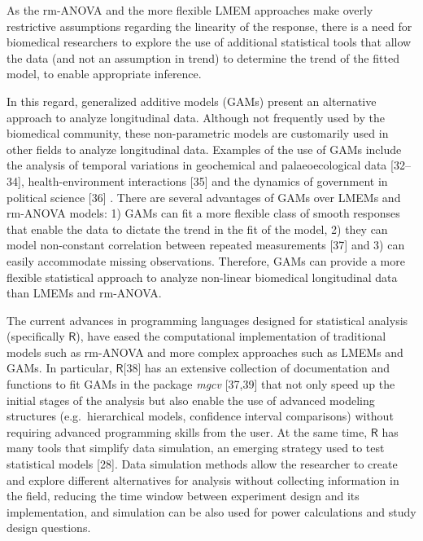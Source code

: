 \documentclass[
]{article}
\begin{document}
As the rm-ANOVA and the more flexible LMEM approaches make overly restrictive assumptions regarding the linearity of the response, there is a need for biomedical researchers to explore the use of additional statistical tools that allow the data (and not an assumption in trend) to determine the trend of the fitted model, to enable appropriate inference.

In this regard, generalized additive models (GAMs) present an alternative approach to analyze longitudinal data. Although not frequently used by the biomedical community, these non-parametric models are customarily used in other fields to analyze longitudinal data. Examples of the use of GAMs include the analysis of temporal variations in geochemical and palaeoecological data {[}32--34{]}, health-environment interactions {[}35{]} and the dynamics of government in political science {[}36{]} . There are several advantages of GAMs over LMEMs and rm-ANOVA models: 1) GAMs can fit a more flexible class of smooth responses that enable the data to dictate the trend in the fit of the model, 2) they can model non-constant correlation between repeated measurements {[}37{]} and 3) can easily accommodate missing observations. Therefore, GAMs can provide a more flexible statistical approach to analyze non-linear biomedical longitudinal data than LMEMs and rm-ANOVA.

The current advances in programming languages designed for statistical analysis (specifically \(\textsf{R}\)), have eased the computational implementation of traditional models such as rm-ANOVA and more complex approaches such as LMEMs and GAMs. In particular, \(\textsf{R}\){[}38{]} has an extensive collection of documentation and functions to fit GAMs in the package \emph{mgcv} {[}37,39{]} that not only speed up the initial stages of the analysis but also enable the use of advanced modeling structures (e.g.~hierarchical models, confidence interval comparisons) without requiring advanced programming skills from the user. At the same time, \(\textsf{R}\) has many tools that simplify data simulation, an emerging strategy used to test statistical models {[}28{]}. Data simulation methods allow the researcher to create and explore different alternatives for analysis without collecting information in the field, reducing the time window between experiment design and its implementation, and simulation can be also used for power calculations and study design questions.
\end{document}
